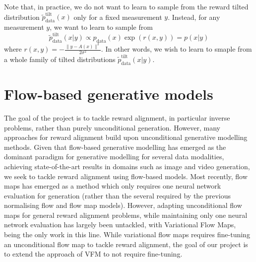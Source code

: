 \documentclass[12pt,a4paper]{report}
\begin{document}
Note that, in practice, we do not want to learn to sample from the reward tilted distribution $\widetilde{p}_{\text{data}}^{\text{tilt}}(x)$ only for a fixed measurement $y$. Instead, for any measurement $y$, we want to learn to sample from
\begin{equation}
    \label{eq:reward_tilted_probability_path}
    \widetilde{p}_{\text{data}}^{\text{tilt}}(x|y) \propto p_{\text{data}}(x) \exp (r(x,y))=p(x|y)
\end{equation}
where $r(x,y) = -\frac{\|y - A(x)\|^2}{2\sigma^2}$. In other words, we wish to learn to smaple from a whole family of tilted distributions $\widetilde{p}_{\text{data}}^{\text{tilt}}(x|y)$. 



\section{Flow-based generative models}

The goal of the project is to tackle reward alignment, in particular inverse problems, rather than purely unconditional generation. 
However, many approaches for reward alignment build upon unconditional generative modelling methods. 
Given that flow-based generative modelling has emerged as the dominant paradigm for generative modelling for several data modalities, achieving state-of-the-art results in domains such as image and video generation, we seek to tackle reward alignment using flow-based models. 
Most recently, flow maps has emerged as a method which only requires one neural network evaluation for generation (rather than the several required by the previous normalising flow and flow map models). 
However, adapting unconditional flow maps for general reward alignment problems, while maintaining only one neural network evaluation has largely been untackled, with Variational Flow Maps, being the only work in this line. 
While variational flow maps requires fine-tuning an unconditional flow map to tackle reward alignment, the goal of our project is to extend the approach of VFM to not require fine-tuning. 
\end{document}
